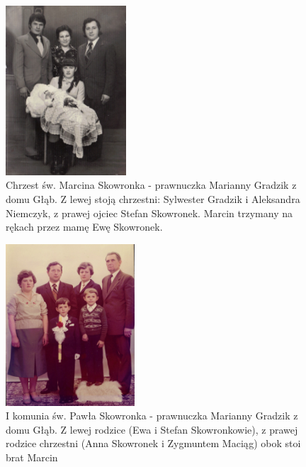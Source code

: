 \begin{figure}[!ht]
\begin{center}
\includegraphics[width=0.4\textwidth]{zdjecia/marcin_skowronek_chrzest.jpg}
\caption[Chrzest św. Marcina Skowronka]{Chrzest św. Marcina Skowronka - prawnuczka Marianny Gradzik z domu Głąb. Z lewej stoją chrzestni: Sylwester Gradzik i Aleksandra Niemczyk, z prawej ojciec Stefan Skowronek. Marcin trzymany na rękach przez mamę Ewę Skowronek.}
\label{rys:marcin_skowronek_chrzest}
\end{center}
\end{figure}

\begin{figure}[!hb]
\begin{center}
\includegraphics[width=0.43\textwidth]{zdjecia/pawel_skowronek_1_komunia.jpg}
\caption[I komunia św. Pawła Skowronka]{I komunia św. Pawła Skowronka - prawnuczka Marianny Gradzik z domu Głąb. Z lewej rodzice (Ewa i Stefan Skowronkowie), z prawej rodzice chrzestni (Anna Skowronek i Zygmuntem Maciąg) obok stoi brat Marcin}
\label{rys:pawel_skowronek_1_komunia}
\end{center}
\end{figure}

